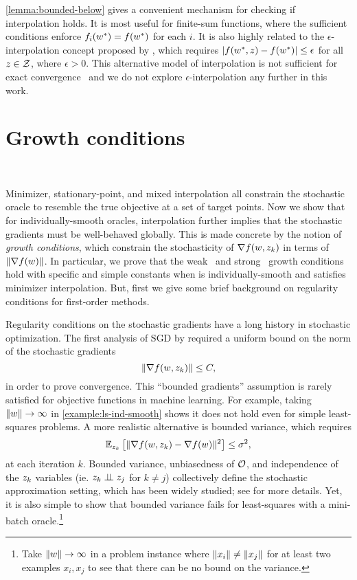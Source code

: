\autoref{lemma:bounded-below} gives a convenient mechanism for checking if interpolation holds.
It is most useful for finite-sum functions, where the sufficient conditions enforce \( f_i(\wopt) = f(\wopt) \) for each \( i \). 
It is also highly related to the \( \epsilon \)-interpolation concept proposed by \citet{berrada2019training}, which requires \( |f(\wopt, \z) - f(\wopt)| \leq \epsilon \) for all \( z \in \calZ \), where \( \epsilon > 0 \).
This alternative model of interpolation is not sufficient for exact convergence~\citep{berrada2019training} and we do not explore \( \epsilon \)-interpolation any further in this work.

\section{Growth conditions}~\label{sec:growth_conditions}

Minimizer, stationary-point, and mixed interpolation all constrain the stochastic oracle to resemble the true objective at a set of target points. 
Now we show that for individually-smooth oracles, interpolation further implies that the stochastic gradients must be well-behaved globally.
This is made concrete by the notion of \emph{growth conditions}, which constrain the stochasticity of \( \grad(\w, \zk) \) in terms of \( \norm{\grad(\w)} \).
In particular, we prove that the weak~\citep{vaswani2019fast} and strong~\citep{schmidt2011convergence} growth conditions hold with specific and simple constants when \oracle{} is individually-smooth and satisfies minimizer interpolation. 
But, first we give some brief background on regularity conditions for first-order methods.

Regularity conditions on the stochastic gradients have a long history in stochastic optimization. 
The first analysis of \ac{SGD} by \citet{robbins1951sgd} required a uniform bound on the norm of the stochastic gradients
\[ \norm{\grad(\w, \zk)} \leq C, \] 
in order to prove convergence. 
This ``bounded gradients'' assumption is rarely satisfied for objective functions in machine learning.
For example, taking \( \norm{\w} \rightarrow \infty \) in \autoref{example:ls-ind-smooth} shows it does not hold even for simple least-squares problems. 
A more realistic alternative is bounded variance, which requires
\[ \Ek \sbr{\norm{\grad(\w, \zk) - \grad(\w)}^2} \leq \sigma^2, \]
at each iteration \( k \). 
Bounded variance, unbiasedness of \( \oracle{} \), and independence of the \( \zk \) variables (ie. \( \zk \ind \z_j \) for \( k \neq j \)) collectively define the stochastic approximation setting, which has been widely studied; see \citet{kushner1997sa} for more details. 
Yet, it is also simple to show that bounded variance fails for least-squares with a mini-batch oracle.\footnote{Take \( \norm{\w} \rightarrow \infty \) in a problem instance where \( \norm{x_i} \neq \norm{x_j} \) for at least two examples \( x_i, x_j \) to see that there can be no bound on the variance.} 

